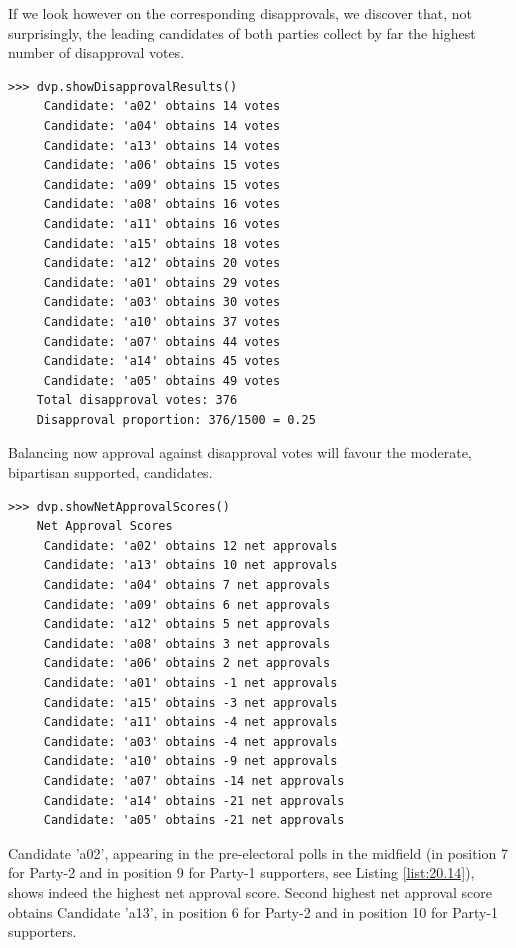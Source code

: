 If we look however on the corresponding disapprovals, we discover that, not surprisingly, the leading candidates of both parties collect by far the highest number of disapproval votes. 
\begin{lstlisting}
>>> dvp.showDisapprovalResults()
     Candidate: 'a02' obtains 14 votes
     Candidate: 'a04' obtains 14 votes
     Candidate: 'a13' obtains 14 votes
     Candidate: 'a06' obtains 15 votes
     Candidate: 'a09' obtains 15 votes
     Candidate: 'a08' obtains 16 votes
     Candidate: 'a11' obtains 16 votes
     Candidate: 'a15' obtains 18 votes
     Candidate: 'a12' obtains 20 votes
     Candidate: 'a01' obtains 29 votes
     Candidate: 'a03' obtains 30 votes
     Candidate: 'a10' obtains 37 votes
     Candidate: 'a07' obtains 44 votes
     Candidate: 'a14' obtains 45 votes
     Candidate: 'a05' obtains 49 votes
    Total disapproval votes: 376
    Disapproval proportion: 376/1500 = 0.25
\end{lstlisting}
Balancing now approval against disapproval votes will favour the moderate, bipartisan supported, candidates.
\begin{lstlisting}
>>> dvp.showNetApprovalScores()
    Net Approval Scores
     Candidate: 'a02' obtains 12 net approvals
     Candidate: 'a13' obtains 10 net approvals
     Candidate: 'a04' obtains 7 net approvals
     Candidate: 'a09' obtains 6 net approvals
     Candidate: 'a12' obtains 5 net approvals
     Candidate: 'a08' obtains 3 net approvals
     Candidate: 'a06' obtains 2 net approvals
     Candidate: 'a01' obtains -1 net approvals
     Candidate: 'a15' obtains -3 net approvals
     Candidate: 'a11' obtains -4 net approvals
     Candidate: 'a03' obtains -4 net approvals
     Candidate: 'a10' obtains -9 net approvals
     Candidate: 'a07' obtains -14 net approvals
     Candidate: 'a14' obtains -21 net approvals
     Candidate: 'a05' obtains -21 net approvals
\end{lstlisting}
Candidate 'a02', appearing in the pre-electoral polls in the midfield (in position 7 for Party-2 and in position 9 for Party-1 supporters, see Listing \ref{list:20.14}), shows indeed the highest net approval score. Second highest net approval score obtains Candidate 'a13', in  position 6 for Party-2 and in position 10 for Party-1 supporters.


